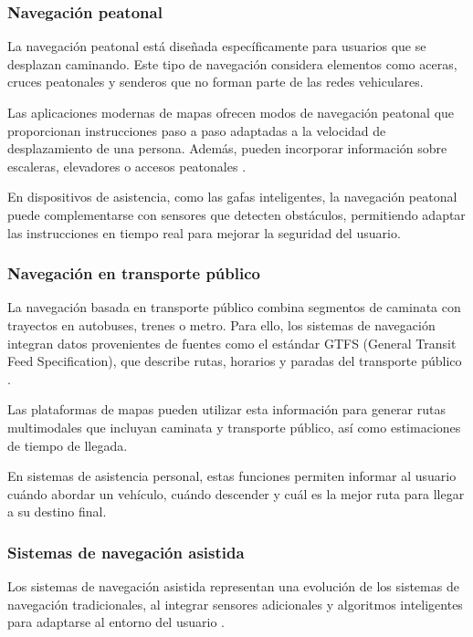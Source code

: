 \subsubsection{Navegación peatonal}

La navegación peatonal está diseñada específicamente para usuarios que se desplazan caminando. Este tipo de navegación considera elementos como aceras, cruces peatonales y senderos que no forman parte de las redes vehiculares.

Las aplicaciones modernas de mapas ofrecen modos de navegación peatonal que proporcionan instrucciones paso a paso adaptadas a la velocidad de desplazamiento de una persona. Además, pueden incorporar información sobre escaleras, elevadores o accesos peatonales \cite{google_directions_api}.

En dispositivos de asistencia, como las gafas inteligentes, la navegación peatonal puede complementarse con sensores que detecten obstáculos, permitiendo adaptar las instrucciones en tiempo real para mejorar la seguridad del usuario.

\subsubsection{Navegación en transporte público}

La navegación basada en transporte público combina segmentos de caminata con trayectos en autobuses, trenes o metro. Para ello, los sistemas de navegación integran datos provenientes de fuentes como el estándar GTFS (General Transit Feed Specification), que describe rutas, horarios y paradas del transporte público \cite{gtfs2024spec}.

Las plataformas de mapas pueden utilizar esta información para generar rutas multimodales que incluyan caminata y transporte público, así como estimaciones de tiempo de llegada.

En sistemas de asistencia personal, estas funciones permiten informar al usuario cuándo abordar un vehículo, cuándo descender y cuál es la mejor ruta para llegar a su destino final.

\subsubsection{Sistemas de navegación asistida}

Los sistemas de navegación asistida representan una evolución de los sistemas de navegación tradicionales, al integrar sensores adicionales y algoritmos inteligentes para adaptarse al entorno del usuario \cite{pmc_assistive_systems}.

